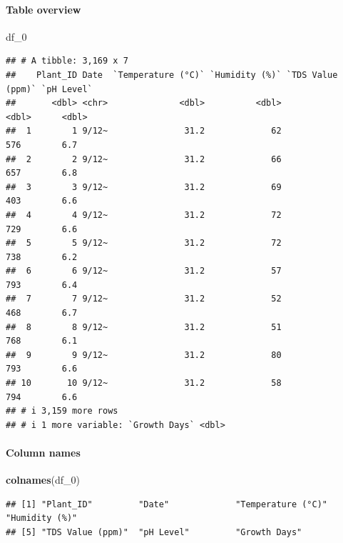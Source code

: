 \documentclass[
]{article}
\newenvironment{Shaded}{\begin{snugshade}}{\end{snugshade}}
\newcommand{\FunctionTok}[1]{\textcolor[rgb]{0.13,0.29,0.53}{\textbf{#1}}}
\newcommand{\NormalTok}[1]{#1}
\begin{document}
\paragraph{Table overview}\label{table-overview}

\begin{Shaded}
\begin{Highlighting}[]
\NormalTok{df\_0}
\end{Highlighting}
\end{Shaded}

\begin{verbatim}
## # A tibble: 3,169 x 7
##    Plant_ID Date  `Temperature (°C)` `Humidity (%)` `TDS Value (ppm)` `pH Level`
##       <dbl> <chr>              <dbl>          <dbl>             <dbl>      <dbl>
##  1        1 9/12~               31.2             62               576        6.7
##  2        2 9/12~               31.2             66               657        6.8
##  3        3 9/12~               31.2             69               403        6.6
##  4        4 9/12~               31.2             72               729        6.6
##  5        5 9/12~               31.2             72               738        6.2
##  6        6 9/12~               31.2             57               793        6.4
##  7        7 9/12~               31.2             52               468        6.7
##  8        8 9/12~               31.2             51               768        6.1
##  9        9 9/12~               31.2             80               793        6.6
## 10       10 9/12~               31.2             58               794        6.6
## # i 3,159 more rows
## # i 1 more variable: `Growth Days` <dbl>
\end{verbatim}

\paragraph{Column names}\label{column-names}

\begin{Shaded}
\begin{Highlighting}[]
\FunctionTok{colnames}\NormalTok{(df\_0)}
\end{Highlighting}
\end{Shaded}

\begin{verbatim}
## [1] "Plant_ID"         "Date"             "Temperature (°C)" "Humidity (%)"    
## [5] "TDS Value (ppm)"  "pH Level"         "Growth Days"
\end{verbatim}
\end{document}

